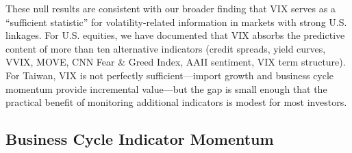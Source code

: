 These null results are consistent with our broader finding that VIX serves as a ``sufficient statistic'' for volatility-related information in markets with strong U.S. linkages. For U.S. equities, we have documented that VIX absorbs the predictive content of more than ten alternative indicators (credit spreads, yield curves, VVIX, MOVE, CNN Fear \& Greed Index, AAII sentiment, VIX term structure). For Taiwan, VIX is not perfectly sufficient---import growth and business cycle momentum provide incremental value---but the gap is small enough that the practical benefit of monitoring additional indicators is modest for most investors.

\subsection{Business Cycle Indicator Momentum}
\label{sec:bci_mom}

